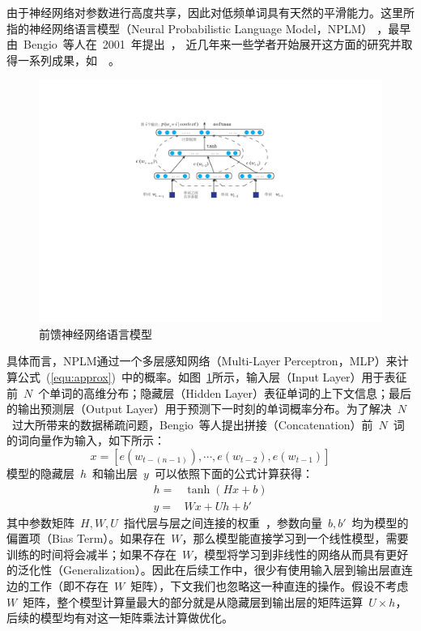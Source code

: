 由于神经网络对参数进行高度共享，因此对低频单词具有天然的平滑能力。这里所指的神经网络语言模型（Neural Probabilistic Language Model，NPLM） ，最早由~Bengio~等人在~2001~年提出~， 近几年来一些学者开始展开这方面的研究并取得一系列成果，如~\cite{DBLP:conf/acl/BaroniDK14,DBLP:journals/sigkdd/BellK07,DBLP:journals/pami/BengioCV13,DBLP:journals/tnn/BengioSF94}~。
\begin{figure}
  \centering
  \includegraphics[width=.85\linewidth]{./figures/nplm.pdf}
  \caption{前馈神经网络语言模型}\label{fig:nplm}
\end{figure}

具体而言，NPLM通过一个多层感知网络（Multi-Layer Perceptron，MLP）来计算公式~(\ref{equ:approx})~中的概率。如图~\ref{fig:nplm}所示，输入层（Input Layer）用于表征前~$N$~个单词的高维分布；隐藏层（Hidden Layer）表征单词的上下文信息；最后的输出预测层（Output Layer）用于预测下一时刻的单词概率分布。为了解决~$N$~过大所带来的数据稀疏问题，Bengio~等人提出拼接（Concatenation）前~$N$~词的词向量作为输入，如下所示：
\begin{equation}\label{equ:we}
  x = [e(w_{t-(n-1)}), \cdots , e(w_{t-2}), e{(w_{t-1})}]
\end{equation}
模型的隐藏层~$h$~和输出层~$y$~可以依照下面的公式计算获得：
\begin{equation}\label{equ:nplm}
\begin{split}
h =& \tanh(Hx+b) \\
y =&Wx + Uh +b'
\end{split}
\end{equation}
其中参数矩阵~$H,W,U$~指代层与层之间连接的权重~，参数向量~$b,b'$~均为模型的偏置项（Bias Term）。如果存在~$W$，那么模型能直接学习到一个线性模型，需要训练的时间将会减半；如果不存在~$W$，模型将学习到非线性的网络从而具有更好的泛化性（Generalization）。因此在后续工作中，很少有使用输入层到输出层直连边的工作（即不存在~$W$~矩阵），下文我们也忽略这一种直连的操作。假设不考虑~$W$~矩阵，整个模型计算量最大的部分就是从隐藏层到输出层的矩阵运算~$U\times h$，后续的模型均有对这一矩阵乘法计算做优化。

